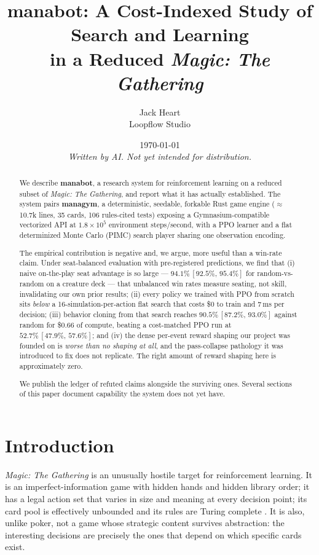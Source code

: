 \documentclass[11pt]{article}
\title{\textbf{manabot}: A Cost-Indexed Study of Search and Learning\\ in a Reduced \textit{Magic: The Gathering}}
\author{Jack Heart\\ \small Loopflow Studio}
\date{\today\\[0.5em]\small\textit{Written by AI. Not yet intended for distribution.}}
\newcommand{\ci}[2]{\,[#1,\,#2]}
\begin{document}
\maketitle

\begin{abstract}
We describe \textbf{manabot}, a research system for reinforcement learning on a reduced subset of \textit{Magic: The Gathering}, and report what it has actually established. The system pairs \textbf{managym}, a deterministic, seedable, forkable Rust game engine ($\approx$10.7k lines, 35 cards, 106 rules-cited tests) exposing a Gymnasium-compatible vectorized API at $1.8\times10^{5}$ environment steps/second, with a PPO learner and a flat determinized Monte Carlo (PIMC) search player sharing one observation encoding.

The empirical contribution is negative and, we argue, more useful than a win-rate claim. Under seat-balanced evaluation with pre-registered predictions, we find that (i) naive on-the-play seat advantage is so large --- $94.1\%\ci{92.5\%}{95.4\%}$ for random-vs-random on a creature deck --- that unbalanced win rates measure seating, not skill, invalidating our own prior results; (ii) every policy we trained with PPO from scratch sits \emph{below} a 16-simulation-per-action flat search that costs \$0 to train and 7\,ms per decision; (iii) behavior cloning from that search reaches $90.5\%\ci{87.2\%}{93.0\%}$ against random for \$0.66 of compute, beating a cost-matched PPO run at $52.7\%\ci{47.9\%}{57.6\%}$; and (iv) the dense per-event reward shaping our project was founded on is \emph{worse than no shaping at all}, and the pass-collapse pathology it was introduced to fix does not replicate. The right amount of reward shaping here is approximately zero.

We publish the ledger of refuted claims alongside the surviving ones. Several sections of this paper document capability the system does not yet have.
\end{abstract}

\section{Introduction}

\textit{Magic: The Gathering} is an unusually hostile target for reinforcement learning. It is an imperfect-information game with hidden hands and hidden library order; it has a legal action set that varies in size and meaning at every decision point; its card pool is effectively unbounded and its rules are Turing complete \citep{churchill2019turing}. It is also, unlike poker, not a game whose strategic content survives abstraction: the interesting decisions are precisely the ones that depend on which specific cards exist.
\end{document}
